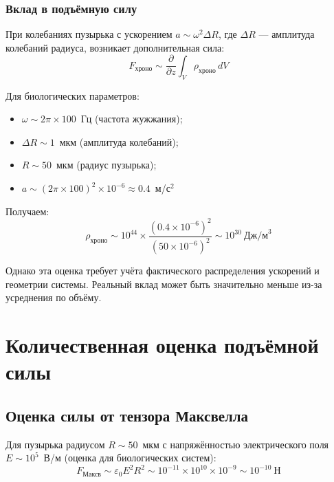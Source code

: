 \documentclass[12pt,a4paper]{article}
\begin{document}
\subsubsection{Вклад в подъёмную силу}

При колебаниях пузырька с ускорением $a \sim \omega^2 \Delta R$, где $\Delta R$ --- амплитуда колебаний радиуса, возникает дополнительная сила:
\begin{equation}
    F_{\text{хроно}} \sim \frac{\partial}{\partial z} \int_V \rho_{\text{хроно}} \, dV
    \label{eq:chrono_force}
\end{equation}

Для биологических параметров:
\begin{itemize}
    \item $\omega \sim 2\pi \times 100$~Гц (частота жужжания);
    \item $\Delta R \sim 1$~мкм (амплитуда колебаний);
    \item $R \sim 50$~мкм (радиус пузырька);
    \item $a \sim (2\pi \times 100)^2 \times 10^{-6} \approx 0.4$~м/с$^2$
\end{itemize}

Получаем:
\begin{equation}
    \rho_{\text{хроно}} \sim 10^{44} \times \frac{(0.4 \times 10^{-6})^2}{(50 \times 10^{-6})^2} \sim 10^{30}~\text{Дж/м}^3
    \label{eq:chrono_estimate}
\end{equation}

Однако эта оценка требует учёта фактического распределения ускорений и геометрии системы. Реальный вклад может быть значительно меньше из-за усреднения по объёму.

\section{Количественная оценка подъёмной силы}

\subsection{Оценка силы от тензора Максвелла}

Для пузырька радиусом $R \sim 50$~мкм с напряжённостью электрического поля $E \sim 10^5$~В/м (оценка для биологических систем):
\begin{equation}
    F_{\text{Максв}} \sim \varepsilon_0 E^2 R^2 \sim 10^{-11} \times 10^{10} \times 10^{-9} \sim 10^{-10}~\text{Н}
    \label{eq:maxwell_estimate}
\end{equation}
\end{document}
